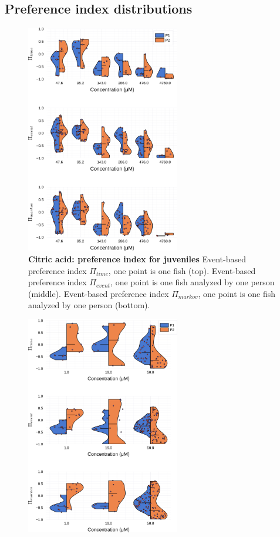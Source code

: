 \begin{appendices}
  \chapter{Preference index distributions}
    \begin{figure}[h]
      \centering
      \includegraphics[width=0.6\textwidth]{part_2/assets/dist_citricacid.png}
      \caption{\textbf{Citric acid: preference index for juveniles} Event-based preference index $\Pi_{time}$, one point is one fish (top). Event-based preference index $\Pi_{event}$, one point is one fish analyzed by one person (middle). Event-based preference index $\Pi_{markov}$, one point is one fish analyzed by one person (bottom).}
      \label{dist_citric_acid}
    \end{figure}
    \begin{figure}[h]
      \centering
      \includegraphics[width=0.6\textwidth]{part_2/assets/dist_adenosine.png}

\end{figure}
\end{appendices}
